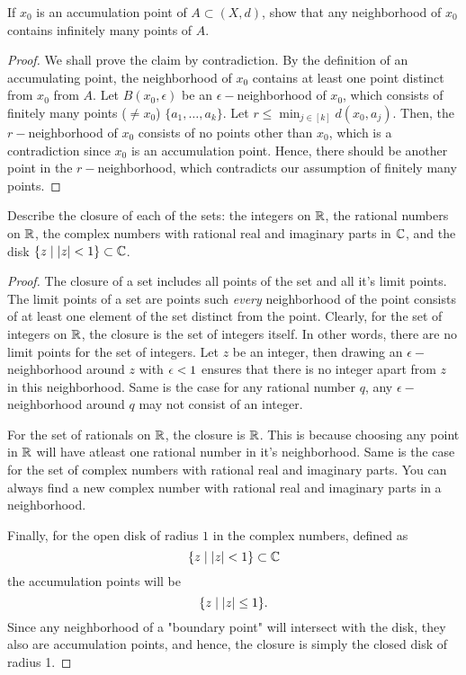 \begin{question}
    If $x_0$ is an accumulation point of $A \subset (X,d)$, show that any neighborhood of $x_0$ contains infinitely many points of $A$.
    \label{section1.3-6}
\end{question}
\begin{proof}
     We shall prove the claim by contradiction. By the definition of an accumulating point, the neighborhood of $x_0$ contains at least one point distinct from $x_0$ from $A$. Let $B(x_0 , \epsilon)$ be an $\epsilon-$neighborhood of $x_0$, which consists of finitely many points ($\neq x_0$)  $\{a_1 , \ldots ,a_k\}$. Let $r \leq \min_{j \in [k]} d(x_0 , a_j)$. Then, the $r-$neighborhood of $x_0$ consists of no points other than $x_0$, which is a contradiction since $x_0$ is an accumulation point. Hence, there should be another point in the $r-$neighborhood, which contradicts our assumption of finitely many points.
\end{proof}

\begin{question}
    Describe the closure of each of the sets: the integers on $\mathbb{R}$, the rational numbers on $\mathbb{R}$, the complex numbers with rational real and imaginary parts in $\mathbb{C}$, and the disk $\{z \mid \left\lvert z \right\rvert < 1\} \subset \mathbb{C}$.
\label{section1.3-7}
\end{question}
\begin{proof}
    The closure of a set includes all points of the set and all it's limit points. The limit points of a set are points such \emph{every} neighborhood of the point consists of at least one element of the set distinct from the point. Clearly, for the set of integers on $\mathbb{R}$, the closure is the set of integers itself. In other words, there are no limit points for the set of integers. Let $z$ be an integer, then drawing an $\epsilon-$neighborhood around $z$ with $\epsilon < 1$ ensures that there is no integer apart from $z$ in this neighborhood. Same is the case for any rational number $q$, any $\epsilon-$neighborhood around $q$ may not consist of an integer.

    For the set of rationals on $\mathbb{R}$, the closure is $\mathbb{R}$. This is because choosing any point in $\mathbb{R}$ will have atleast one rational number in it's neighborhood. Same is the case for the set of complex numbers with rational real and imaginary parts. You can always find a new complex number with rational real and imaginary parts in a neighborhood. 

    Finally, for the open disk of radius $1$ in the complex numbers, defined as
    \[\{z \mid \left\lvert z \right\rvert < 1\} \subset \mathbb{C}\]
    the accumulation points will be 
     \[\{z \mid \left\lvert z \right\rvert \leq 1\}.\]
     Since any neighborhood of a "boundary point" will intersect with the disk, they also are accumulation points, and hence, the closure is simply the closed disk of radius 1.
\end{proof}

